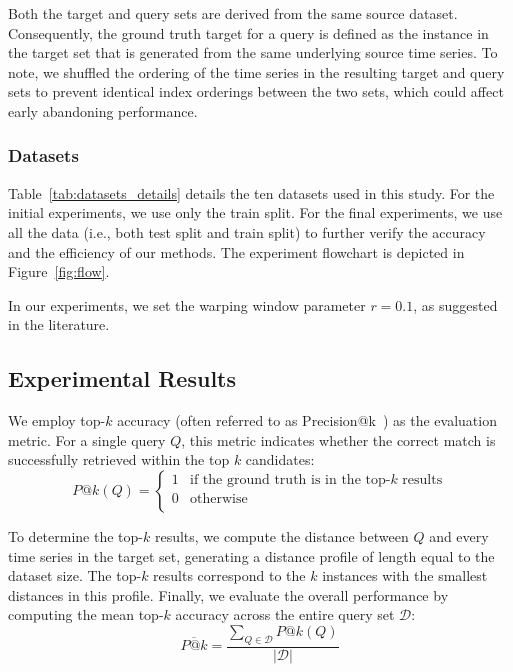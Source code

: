 Both the target and query sets are derived from the same source dataset. Consequently, the ground truth target for a query is defined as the instance in the target set that is generated from the same underlying source time series.
To note, we shuffled the ordering of the time series in the resulting target and query sets to prevent identical index orderings between the two sets, which could affect early abandoning performance.

\subsubsection{Datasets} %



Table~\ref{tab:datasets_details} details the ten datasets used in this study. 
%
For the initial experiments, we use only the train split.
For the final experiments, we use all the data (i.e., both test split and train split) to further verify the accuracy and the efficiency of our methods.
The experiment flowchart is depicted in Figure~\ref{fig:flow}.

In our experiments, we set the warping window parameter $r = 0.1$, as suggested in the literature.

\subsection{Experimental Results} \label{sec:experimental-results}

We employ top-$k$ accuracy (often referred to as Precision@k~\cite{tatbul2018precision}) as the evaluation metric. 
For a single query $Q$, this metric indicates whether the correct match is successfully retrieved within the top $k$ candidates:
\begin{equation} 
\label{eq:precision-k}
P@k(Q) = 
\begin{cases}
    1 & \text{if the ground truth is in the top-$k$ results}\\
    0 & \text{otherwise}\\
\end{cases}
\end{equation}

To determine the top-$k$ results, we compute the distance between $Q$ and every time series in the target set, generating a distance profile of length equal to the dataset size. 
The top-$k$ results correspond to the $k$ instances with the smallest distances in this profile. 
Finally, we evaluate the overall performance by computing the mean top-$k$ accuracy across the entire query set $\mathcal{D}$:
\begin{equation} 
\label{eq:precision-k-mean}
\overbar{P@k} = \frac{\sum_{Q \in \mathcal{D}}{P@k(Q)}}{|\mathcal{D}|}
\end{equation}

